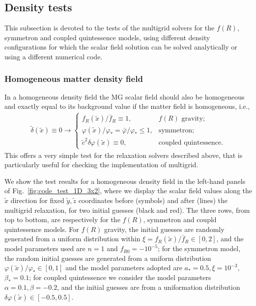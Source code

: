 \subsection{Density tests}

This subsection is devoted to the tests of the multigrid solvers for the $f(R)$, symmetron and coupled quintessence models, using different density configurations for which the scalar field solution can be solved analytically or using a different numerical code.


\subsubsection{Homogeneous matter density field}
\label{subsubsec:homogeneous_rhom_test}

In a homogeneous density field the \ac{MG} scalar field should also be homogeneous and exactly equal to its background value if the matter field is homogeneous, i.e.,
\begin{align}\label{eq:field_uniform_dens_test}
    \tilde{\delta}(\tilde{x}) \equiv 0 \longrightarrow \begin{cases}
        f_R(\tilde{x}) / \bar{f}_R \equiv 1, & \text{$f(R)$ gravity;} \\
        \varphi(\tilde{x}) / \varphi_\ast = \bar{\varphi}/\varphi_\ast \leq 1, & \text{symmetron;} \\
        \tilde{c}^2\delta\varphi(\tilde{x}) \equiv 0, & \text{coupled quintessence.}
    \end{cases}
\end{align}
This offers a very simple test for the relaxation solvers described above, that is particularly useful for checking the implementation of multigrid.

We show the test results for a homogeneous density field in the left-hand panels of Fig.~\ref{fig:code_test_1D_3x2}, where we display the scalar field values along the $\tilde{x}$ direction for fixed $\tilde{y}, \tilde{z}$ coordinates before (symbols) and after (lines) the multigrid relaxation, for two initial guesses (black and red). The three rows, from top to bottom, are respectively for the $f(R)$, symmetron and coupld quintessence models. For $f(R)$ gravity, the initial guesses are randomly generated from a uniform distribution within $\xi=f_R(\tilde{x}) / \bar{f}_R\in[0,2]$, and the model parameters used are $n=1$ and $f_{R0}=-10^{-5}$; for the symmetron model, the random initial guesses are generated from a uniform distribution $\varphi(\tilde{x})/\varphi_\ast\in[0,1]$ and the model parameters adopted are $a_\ast = 0.5, \xi = 10^{-3}$, $\beta_\ast = 0.1$; for coupled quintessence we consider the model parameters $\alpha = 0.1, \beta = -0.2$, and the initial guesses are from a uniformation distribution $\delta\varphi(\tilde{x})\in[-0.5,0.5]$.

